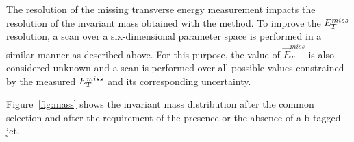 The resolution of the missing transverse energy measurement impacts the resolution of the invariant mass obtained with the \mmc method.
To improve the $E_{T}^{miss}$ resolution, a scan over a six-dimensional parameter space is performed 
in a similar manner as described above. For this purpose, the value of $\vec{E}_T^{miss}$ is also considered unknown and a scan 
is performed over all possible values constrained by the measured $E_{T}^{miss}$ and its corresponding uncertainty.
%

Figure~\ref{fig:mass} shows the  \mmc invariant mass distribution after the common selection and after the requirement of the presence or the
absence of a b-tagged jet.

 


